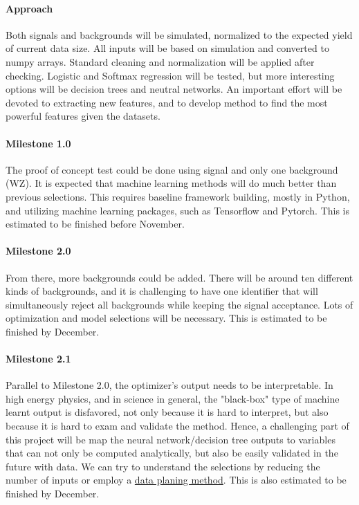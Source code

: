 \documentclass[11pt]{article}
\begin{document}
\paragraph{Approach}
Both signals and backgrounds will be simulated, normalized to the expected yield of current data size. All inputs will be based on simulation and converted to numpy arrays. Standard cleaning and normalization will be applied after checking. Logistic and Softmax regression will be tested, but more interesting options will be decision trees and neutral networks. An important effort will be devoted to extracting new features, and to develop method to find the most powerful features given the datasets.

\paragraph{Milestone 1.0}
The proof of concept test could be done using signal and only one background (WZ). It is expected that machine learning methods will do much better than previous selections. This requires baseline framework building, mostly in Python, and utilizing machine learning packages, such as Tensorflow and Pytorch. This is estimated to be finished before November.

\paragraph{Milestone 2.0}
From there, more backgrounds could be added. There will be around ten different kinds of backgrounds, and it is challenging to have one identifier that will simultaneously reject all backgrounds while keeping the signal acceptance. Lots of optimization and model selections will be necessary. This is estimated to be finished by December.

\paragraph{Milestone 2.1}
Parallel to Milestone 2.0, the optimizer's output needs to be interpretable. In high energy physics, and in science in general, the "black-box" type of machine learnt output is disfavored, not only because it is hard to interpret, but also because it is hard to exam and validate the method. Hence, a challenging part of this project will be map the neural network/decision tree outputs to variables that can not only be computed analytically, but also be easily validated in the future with data. We can try to understand the selections by reducing the number of inputs or employ a \href{https://arxiv.org/pdf/1709.10106.pdf}{data planing method}. This is also estimated to be finished by December.
\end{document}
